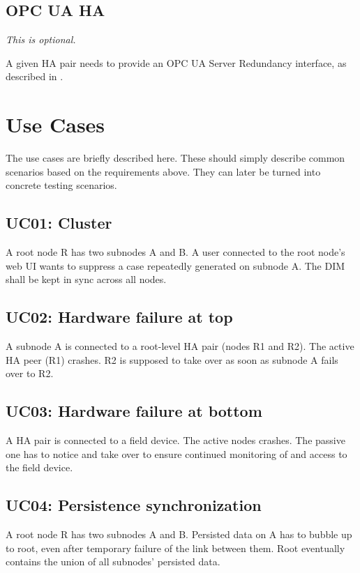 \subsection{OPC UA HA}
\emph{This is optional.}

A given \gls{HA} pair needs to provide an OPC UA Server Redundancy interface,
as described in \cite[6.4.2.4 Non-transparent Redundancy,
p.~96]{opc-ua:behavior:server-redundancy}.

\section{Use Cases}
The use cases are briefly described here. These should simply describe common
scenarios based on the requirements above. They can later be turned into
concrete testing scenarios.

\subsection{UC01: Cluster}
A root node R has two subnodes A and B. A user connected to the root node's web
UI wants to suppress a case repeatedly generated on subnode A. The DIM shall be
kept in sync across all nodes.

\subsection{UC02: Hardware failure at top}
A subnode A is connected to a root-level HA pair (nodes R1 and R2). The active
HA peer (R1) crashes. R2 is supposed to take over as soon as subnode A fails
over to R2.

\subsection{UC03: Hardware failure at bottom}
A HA pair is connected to a field device. The active nodes crashes. The passive
one has to notice and take over to ensure continued monitoring of and access to
the field device.

\subsection{UC04: Persistence synchronization}
A root node R has two subnodes A and B. Persisted data on A has to bubble up to
root, even after temporary failure of the link between them. Root eventually
contains the union of all subnodes' persisted data.

